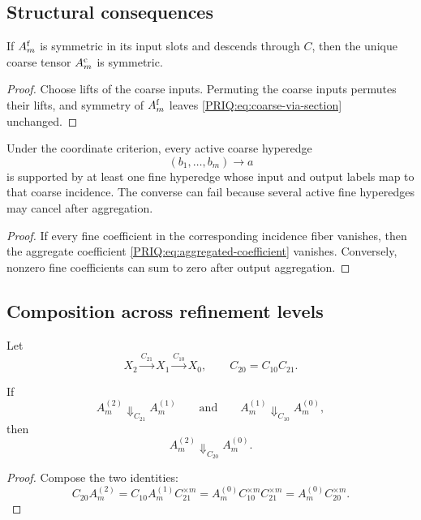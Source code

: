 \subsection{Structural consequences}

\begin{PRIQproposition}\label{PRIQ:prop:symmetry-descends}
If $A_m^{\mathrm f}$ is symmetric in its input slots and descends through $C$, then the unique coarse tensor $A_m^{\mathrm c}$ is symmetric.
\end{PRIQproposition}

\begin{proof}
Choose lifts of the coarse inputs.  Permuting the coarse inputs permutes their lifts, and symmetry of $A_m^{\mathrm f}$ leaves \eqref{PRIQ:eq:coarse-via-section} unchanged.
\end{proof}

\begin{PRIQproposition}\label{PRIQ:prop:quotient-support}
Under the coordinate criterion, every active coarse hyperedge
\[
  (b_1,\ldots,b_m)\longrightarrow a
\]
is supported by at least one fine hyperedge whose input and output labels map to that coarse incidence.  The converse can fail because several active fine hyperedges may cancel after aggregation.
\end{PRIQproposition}

\begin{proof}
If every fine coefficient in the corresponding incidence fiber vanishes, then the aggregate coefficient \eqref{PRIQ:eq:aggregated-coefficient} vanishes.  Conversely, nonzero fine coefficients can sum to zero after output aggregation.
\end{proof}

\subsection{Composition across refinement levels}
Let
\[
  X_2\xrightarrow{C_{21}}X_1\xrightarrow{C_{10}}X_0,
  \qquad
  C_{20}=C_{10}C_{21}.
\]

\begin{PRIQproposition}\label{PRIQ:prop:quotient-transitivity}
If
\[
  A_m^{(2)}\Downarrow_{C_{21}}A_m^{(1)}
  \qquad\text{and}\qquad
  A_m^{(1)}\Downarrow_{C_{10}}A_m^{(0)},
\]
then
\[
  A_m^{(2)}\Downarrow_{C_{20}}A_m^{(0)}.
\]
\end{PRIQproposition}

\begin{proof}
Compose the two identities:
\[
  C_{20}A_m^{(2)}
  =C_{10}A_m^{(1)}C_{21}^{\times m}
  =A_m^{(0)}C_{10}^{\times m}C_{21}^{\times m}
  =A_m^{(0)}C_{20}^{\times m}.
\]
\end{proof}

